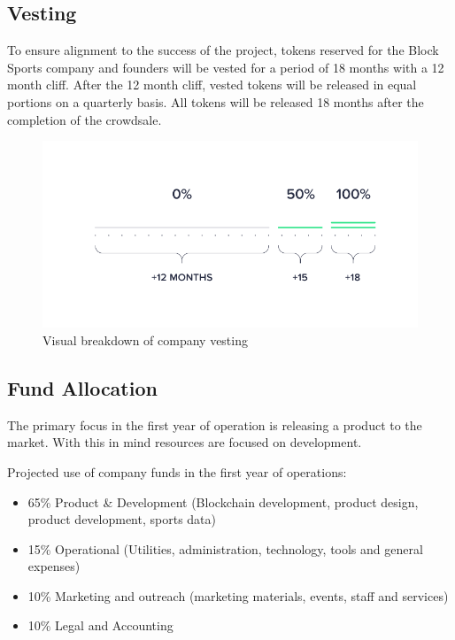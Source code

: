 \documentclass{article}
\begin{document}
	\subsection{Vesting} \label{vesting}
To ensure alignment to the success of the project, tokens reserved for the Block Sports company and founders will be vested for a period of 18 months with a 12 month cliff. After the 12 month cliff, vested tokens will be released in equal portions on a quarterly basis. All tokens will be released 18 months after the completion of the crowdsale.

\begin{figure}[!htb]
\centering
\includegraphics[scale=.3]{./images/vesting-diagram.png}
\caption{Visual breakdown of company vesting}
\label{figure:vesting}
\end{figure}


	\subsection{Fund Allocation} \label{fund-allocation}
The primary focus in the first year of operation is releasing a product to the market. With this in mind resources are focused on development.

Projected use of company funds in the first year of operations:

\begin{itemize}
	\item  65\% Product \& Development (Blockchain development, product design, product development, sports data)
	\item 15\% Operational (Utilities, administration, technology, tools and general expenses)
	\item 10\% Marketing and outreach (marketing materials, events, staff and services)
	\item 10\% Legal and Accounting
\end{itemize}
\end{document}
